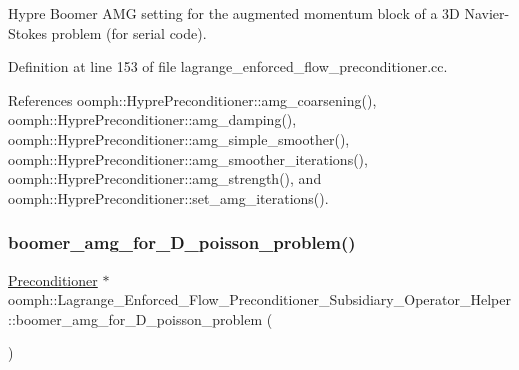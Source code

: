 Hypre Boomer A\+MG setting for the augmented momentum block of a 3D Navier-\/\+Stokes problem (for serial code). 



Definition at line 153 of file lagrange\+\_\+enforced\+\_\+flow\+\_\+preconditioner.\+cc.



References oomph\+::\+Hypre\+Preconditioner\+::amg\+\_\+coarsening(), oomph\+::\+Hypre\+Preconditioner\+::amg\+\_\+damping(), oomph\+::\+Hypre\+Preconditioner\+::amg\+\_\+simple\+\_\+smoother(), oomph\+::\+Hypre\+Preconditioner\+::amg\+\_\+smoother\+\_\+iterations(), oomph\+::\+Hypre\+Preconditioner\+::amg\+\_\+strength(), and oomph\+::\+Hypre\+Preconditioner\+::set\+\_\+amg\+\_\+iterations().

\mbox{\label{namespaceoomph_1_1Lagrange__Enforced__Flow__Preconditioner__Subsidiary__Operator__Helper_a5a9bdc5c6ca31c52c123af6964e00d12}} 
\subsubsection{\texorpdfstring{boomer\+\_\+amg\+\_\+for\+\_\+D\+\_\+poisson\+\_\+problem()}{boomer\_amg\_for\_3D\_poisson\_problem()}}
{\footnotesize\ttfamily \hyperlink{classoomph_1_1Preconditioner}{Preconditioner} $\ast$ oomph\+::\+Lagrange\+\_\+\+Enforced\+\_\+\+Flow\+\_\+\+Preconditioner\+\_\+\+Subsidiary\+\_\+\+Operator\+\_\+\+Helper\+::boomer\+\_\+amg\+\_\+for\+\_\+D\+\_\+poisson\+\_\+problem (\begin{DoxyParamCaption}{ }\end{DoxyParamCaption})}



